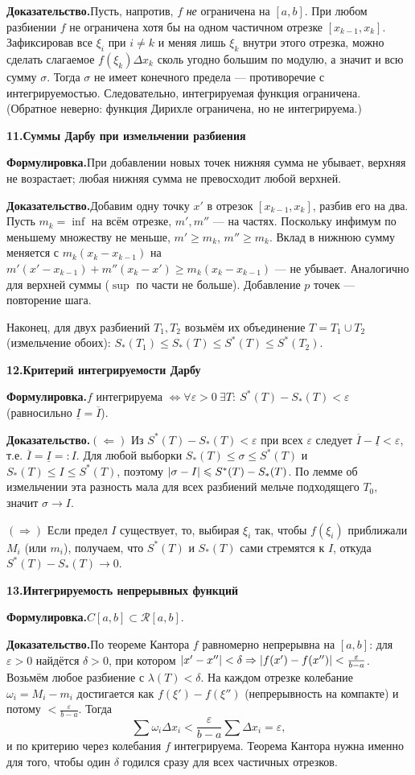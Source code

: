 \documentclass[10pt,a4paper]{article}
\newcommand{\eps}{\varepsilon}
\renewcommand{\le}{\leqslant}
\renewcommand{\ge}{\geqslant}
\DeclarePairedDelimiter{\abs}{\lvert}{\rvert}
\theoremstyle{definition}
\theoremstyle{plain}
\newcommand{\writespace}{\vspace{7.5mm}}
\newcommand{\prf}[2]{%
  \par\writespace\noindent
  {\large\bfseries\color{accent}#1.\enspace #2}\par\smallskip}
\newcommand{\stmt}{\par\noindent\textbf{Формулировка.}\enspace}
\newcommand{\dok}{\par\noindent\textbf{Доказательство.}\enspace}
\begin{document}
\dok Пусть, напротив, $f$ \emph{не} ограничена на $[a,b]$. При любом разбиении $f$ не ограничена
хотя бы на одном частичном отрезке $[x_{k-1},x_k]$. Зафиксировав все $\xi_i$ при $i\ne k$ и меняя
лишь $\xi_k$ внутри этого отрезка, можно сделать слагаемое $f(\xi_k)\Delta x_k$ сколь угодно
большим по модулю, а значит и всю сумму $\sigma$. Тогда $\sigma$ не имеет конечного предела —
противоречие с интегрируемостью. Следовательно, интегрируемая функция ограничена. (Обратное
неверно: функция Дирихле ограничена, но не интегрируема.)

\prf{11}{Суммы Дарбу при измельчении разбиения}
\stmt При добавлении новых точек нижняя сумма не убывает, верхняя не возрастает; любая нижняя сумма
не превосходит любой верхней.

\dok Добавим одну точку $x'$ в отрезок $[x_{k-1},x_k]$, разбив его на два. Пусть $m_k=\inf$ на всём
отрезке, $m',m''$ — на частях. Поскольку инфимум по меньшему множеству не меньше, $m'\ge m_k$,
$m''\ge m_k$. Вклад в нижнюю сумму меняется с $m_k(x_k-x_{k-1})$ на
$m'(x'-x_{k-1})+m''(x_k-x')\ge m_k(x_k-x_{k-1})$ — не убывает. Аналогично для верхней суммы
($\sup$ по части не больше). Добавление $p$ точек — повторение шага.

Наконец, для двух разбиений $T_1,T_2$ возьмём их объединение $T=T_1\cup T_2$ (измельчение обоих):
$S_*(T_1)\le S_*(T)\le S^*(T)\le S^*(T_2)$.

\prf{12}{Критерий интегрируемости Дарбу}
\stmt $f$ интегрируема $\iff\forall\eps>0\ \exists T:\ S^*(T)-S_*(T)<\eps$ (равносильно
$\underline I=\overline I$).

\dok $(\Leftarrow)$ Из $S^*(T)-S_*(T)<\eps$ при всех $\eps$ следует
$\overline I-\underline I<\eps$, т.е. $\overline I=\underline I=:I$. Для любой выборки
$S_*(T)\le\sigma\le S^*(T)$ и $S_*(T)\le I\le S^*(T)$, поэтому $\abs{\sigma-I}\le S^*(T)-S_*(T)$. По
лемме об измельчении эта разность мала для всех разбиений мельче подходящего $T_0$, значит
$\sigma\to I$.

$(\Rightarrow)$ Если предел $I$ существует, то, выбирая $\xi_i$ так, чтобы $f(\xi_i)$ приближали
$M_i$ (или $m_i$), получаем, что $S^*(T)$ и $S_*(T)$ сами стремятся к $I$, откуда
$S^*(T)-S_*(T)\to0$.

\prf{13}{Интегрируемость непрерывных функций}
\stmt $C[a,b]\subset\mathcal R[a,b]$.

\dok По теореме Кантора $f$ равномерно непрерывна на $[a,b]$: для $\eps>0$ найдётся $\delta>0$, при
котором $\abs{x'-x''}<\delta\Rightarrow\abs{f(x')-f(x'')}<\tfrac{\eps}{b-a}$. Возьмём любое
разбиение с $\lambda(T)<\delta$. На каждом отрезке колебание $\omega_i=M_i-m_i$ достигается как
$f(\xi')-f(\xi'')$ (непрерывность на компакте) и потому $<\tfrac{\eps}{b-a}$. Тогда
\[
  \sum\omega_i\Delta x_i<\frac{\eps}{b-a}\sum\Delta x_i=\eps,
\]
и по критерию через колебания $f$ интегрируема. Теорема Кантора нужна именно для того, чтобы один
$\delta$ годился сразу для всех частичных отрезков.
\end{document}
